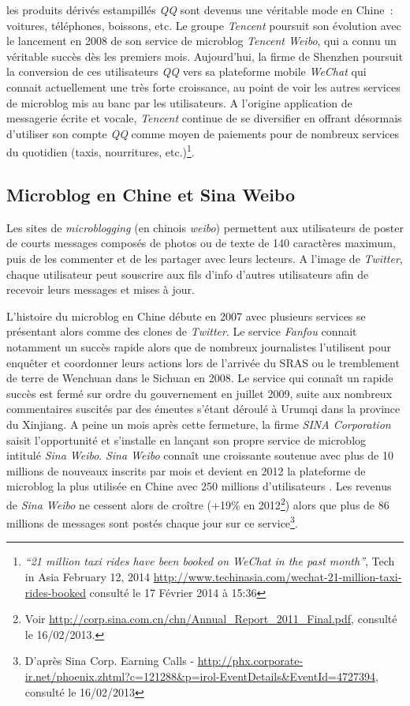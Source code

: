 les produits dérivés estampillés \textit{QQ} sont devenus une véritable mode en Chine : voitures, téléphones, boissons, etc. Le groupe \textit{Tencent} poursuit son évolution avec le lancement en 2008 de son service de microblog \textit{Tencent Weibo}, qui a connu un véritable succès dès les premiers mois. Aujourd’hui, la firme de Shenzhen poursuit la conversion de ces utilisateurs \textit{QQ} vers sa plateforme mobile \textit{WeChat} qui connait actuellement une très forte croissance, au point de voir les autres services de microblog mis au banc par les utilisateurs. A l’origine application de messagerie écrite et vocale, \textit{Tencent} continue de se diversifier en offrant désormais d’utiliser son compte \textit{QQ} comme moyen de paiements pour de nombreux services du quotidien (taxis, nourritures, etc.)\footnote{\textit{“21 million taxi rides have been booked on WeChat in the past month”}, Tech in Asia February 12, 2014 \url{http://www.techinasia.com/wechat-21-million-taxi-rides-booked} consulté le 17 Février 2014 à 15:36}.

\subsection[Microblog en Chine et Sina Weibo]{Microblog en Chine et Sina Weibo}
Les sites de \textit{microblogging} (en chinois \textit{weibo}) permettent aux utilisateurs de poster de courts messages composés de photos ou de texte de 140 caractères maximum, puis de les commenter et de les partager avec leurs lecteurs. A l’image de \textit{Twitter}, chaque utilisateur peut souscrire aux fils d’info d’autres utilisateurs afin de recevoir leurs messages et mises à jour.

L’histoire du microblog en Chine débute en 2007 avec plusieurs services se présentant alors comme des clones de \textit{Twitter}. Le service \textit{Fanfou} connait notamment un succès rapide alors que de nombreux journalistes l’utilisent pour enquêter et coordonner leurs actions lors de l’arrivée du SRAS ou le tremblement de terre de Wenchuan dans le Sichuan en 2008. Le service qui connaît un rapide succès est fermé sur ordre du gouvernement en juillet 2009, suite aux nombreux commentaires suscités par des émeutes s’étant déroulé à Urumqi dans la province du Xinjiang. A peine un mois après cette fermeture, la firme \textit{SINA Corporation} saisit l’opportunité et s’installe en lançant son propre service de microblog intitulé \textit{Sina Weibo}. \textit{Sina Weibo} connaît une croissante soutenue avec plus de 10 millions de nouveaux inscrits par mois et devient en 2012 la plateforme de microblog la plus utilisée en Chine avec 250 millions d’utilisateurs \citep{McKinsey2012}. Les revenus de \textit{Sina Weibo} ne cessent alors de croître (+19\% en 2012\footnote{Voir \url{http://corp.sina.com.cn/chn/Annual_Report_2011_Final.pdf}, consulté le 16/02/2013.}) alors que plus de 86 millions de messages sont postés chaque jour sur ce service\footnote{D’après Sina Corp. Earning Calls - \url{http://phx.corporate-ir.net/phoenix.zhtml?c=121288&p=irol-EventDetails&EventId=4727394}, consulté le 16/02/2013}. 


